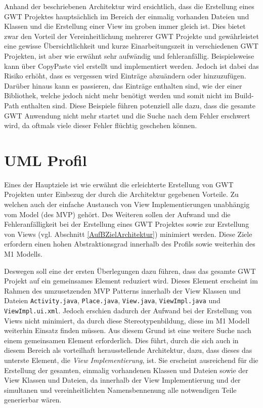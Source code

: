 Anhand der beschriebenen Architektur wird ersichtlich, dass die Erstellung eines
GWT Projektes hauptsächlich im Bereich der einmalig vorhanden Dateien und
Klassen und die Erstellung einer View im groben immer gleich ist. Dies bietet
zwar den Vorteil der Vereinheitlichung mehrerer GWT Projekte und gewährleistet
eine gewisse Übersichtlichkeit und kurze Einarbeitungszeit in verschiedenen GWT
Projekten, ist aber wie erwähnt sehr aufwändig und fehleranfällig.
Beispielsweise kann über \glqq{}CopyPaste\grqq{} viel erstellt und implementiert
werden. Jedoch ist dabei das Risiko erhöht, dass es vergessen wird Einträge abzuändern oder
hinzuzufügen. Darüber hinaus kann es passieren, das Einträge enthalten sind, wie
der einer Bibliothek, welche jedoch nicht mehr benötigt werden und somit nicht
im Build-Path enthalten sind.
Diese Beispiele führen potenziell alle dazu, dass die gesamte GWT Anwendung nicht mehr startet
und die Suche nach dem Fehler erschwert wird, da oftmals viele dieser
Fehler flüchtig geschehen können. 
\section{UML Profil}\label{AufBProfil}
Eines der Hauptziele ist wie erwähnt die erleichterte Erstellung von GWT
Projekten unter Einbezug der durch die Architektur gegebenen Vorteile. Zu
welchen auch der einfache Austausch von View Implementierungen unabhängig vom
Model (des MVP) gehört. Des Weiteren sollen der Aufwand und die
Fehleranfälligkeit bei der Erstellung eines GWT Projektes sowie zur Erstellung von Views (vgl.
Abschnitt \ref{AufBZielArchitektur}) minimiert werden. Diese Ziele
erfordern einen hohen Abstraktionsgrad innerhalb des Profils sowie weiterhin des
M1 Modells.

Deswegen soll eine der ersten Überlegungen dazu führen, dass das
gesamte GWT Projekt auf ein gemeinsames Element reduziert wird. Dieses
Element erscheint im Rahmen des umzusetzenden
MVP Patterns innerhalb der View Klassen und Dateien
\texttt{Activity.java}, \texttt{Place.java},
\texttt{View.java}, \texttt{ViewImpl.java}
und \texttt{ViewImpl.ui.xml}. Jedoch erschien dadurch der Aufwand bei der
Erstellung von Views nicht minimiert, da durch diese Stereotypenbildung, diese
im M1 Modell weiterhin Einsatz finden müssen. Aus diesem Grund ist eine weitere
Suche nach einem gemeinsamen Element erforderlich. Dies führt, durch die sich
auch in diesem Bereich als vorteilhaft herausstellende Architektur, dazu, dass
dieses das unterste Element, die \textit{View Implementierung}, ist. Sie
erscheint ausreichend für die Erstellung der gesamten, einmalig vorhandenen
Klassen und Dateien sowie der View Klassen und Dateien, da innerhalb der View
Implementierung und der simultanen und vereinheitlichten Namensbennenung alle
notwendigen Teile generierbar wären. 

